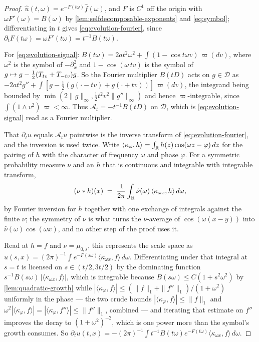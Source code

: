 \begin{proof}
\leanok
$\hat u(t,\omega) = e^{-F(t\omega)}\hat f(\omega)$, and $F$ is $C^1$ off the origin with
$\omega F'(\omega) = B(\omega)$ by \ref{lem:selfdecomposable-exponents} and \ref{eq:symbol};
differentiating in $t$ gives \ref{eq:evolution-fourier}, since
$\partial_t F(t\omega) = \omega F'(t\omega) = t^{-1}B(t\omega)$.

For \ref{eq:evolution-signal}: $B(t\omega) = 2at^2\omega^2 + \int(1 - \cos t\omega
v)\,\varpi(dv)$, where $\omega^2$ is the symbol of $-\partial_x^2$ and $1 - \cos(\omega\,tv)$
is the symbol of $g \mapsto g - \tfrac12(T_{tv} + T_{-tv})g$. So the Fourier multiplier
$B(tD)$ acts on $g \in \mathcal{D}$ as
$-2at^2g'' + \int[g - \tfrac12(g(\cdot - tv) + g(\cdot + tv))]\,\varpi(dv)$, the integrand
being bounded by $\min(2\|g\|_\infty, \tfrac12t^2v^2\|g''\|_\infty)$ and hence
$\varpi$-integrable, since $\int (1 \wedge v^2)\,\varpi < \infty$. Thus
$\mathcal{A}_t = -t^{-1}B(tD)$ on $\mathcal{D}$, which is \ref{eq:evolution-signal} read as a
Fourier multiplier.

That $\partial_t u$ equals $\mathcal{A}_tu$ pointwise is the inverse transform of
\ref{eq:evolution-fourier}, and the inversion is used twice. Write
$\langle\kappa_\varphi, h\rangle = \int_{\mathbb{R}} h(z)\cos(\omega z - \varphi)\,dz$ for the pairing of
$h$ with the character of frequency $\omega$ and phase $\varphi$. For a symmetric probability
measure $\nu$ and an $h$ that is continuous and integrable with integrable transform,
\[
  (\nu * h)(x) \;=\; \frac{1}{2\pi}\int_{\mathbb{R}} \hat\nu(\omega)\,
    \langle\kappa_{\omega x}, h\rangle\,d\omega ,
\]
by Fourier inversion for $h$ together with one exchange of integrals against the finite $\nu$;
the symmetry of $\nu$ is what turns the $\nu$-average of $\cos(\omega(x-y))$ into
$\hat\nu(\omega)\cos(\omega x)$, and no other step of the proof uses it.

Read at $h = f$ and $\nu = \mu_{0,s}$, this represents the scale space as
$u(s,x) = (2\pi)^{-1}\int e^{-F(s\omega)}\langle\kappa_{\omega x},f\rangle\,d\omega$.
Differentiating under that integral at $s = t$ is licensed on $s \in (t/2, 3t/2)$ by the
dominating function $s^{-1}B(s\omega)\,|\langle\kappa_{\omega x},f\rangle|$, which is integrable
because $B(s\omega) \le C(1 + s^2\omega^2)$ by \ref{lem:quadratic-growth} while
$|\langle\kappa_\varphi, f\rangle| \le (\|f\|_1 + \|f''\|_1)/(1 + \omega^2)$ uniformly in the
phase --- the two crude bounds $|\langle\kappa_\varphi,f\rangle| \le \|f\|_1$ and
$\omega^2|\langle\kappa_\varphi,f\rangle| = |\langle\kappa_\varphi,f''\rangle| \le \|f''\|_1$,
combined --- and iterating that estimate on $f''$ improves the decay to
$(1 + \omega^2)^{-2}$, which is one power more than the symbol's growth consumes. So
$\partial_tu(t,x)
 = -(2\pi)^{-1}\int t^{-1}B(t\omega)e^{-F(t\omega)}\langle\kappa_{\omega x},f\rangle\,d\omega$.


\end{proof}
